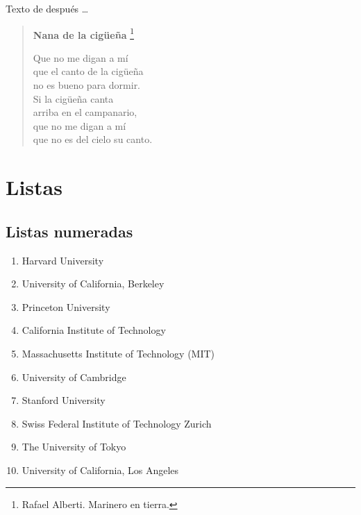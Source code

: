 \documentclass[11pt,a4paper]{report}
\begin{document}
Texto de después \dots



\begin{verse}
\textbf{Nana de la cigüeña}
\footnote{Rafael Alberti. Marinero en tierra.}

Que no me digan a mí\\
que el canto de la cigüeña\\
no es bueno para dormir.\\[5mm]
Si la cigüeña canta\\
arriba en el campanario,\\
que no me digan a mí\\
que no es del cielo su canto.
\end{verse}


\chapter{Listas}


\section{Listas numeradas}

\begin{enumerate}
\item Harvard University
\item University of California, Berkeley
%
\item Princeton University

\item California Institute of Technology

\item Massachusetts Institute of Technology (MIT)

\item University of Cambridge

\item Stanford University

\item Swiss Federal Institute of Technology Zurich

\item The University of Tokyo

\item University of California, Los Angeles
\end{enumerate}
\bigskip
\end{document}
